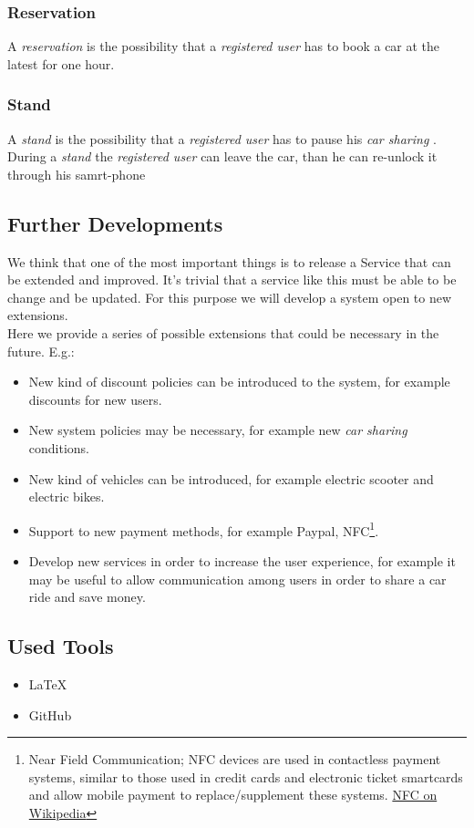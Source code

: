 \documentclass[english]{article}
\newcommand{\carsharing}{\textit {car sharing }}
\newcommand{\registereduser}{\textit {registered user }}
\newcommand{\resevation}{\textit{reservation }}
\newcommand{\stand}{\textit{stand }}
\begin{document}
	\subsubsection{Reservation}
		A \resevation is the possibility that a \registereduser has to book a car at the latest for one hour.
	\subsubsection{Stand}
		A \stand is the possibility that a \registereduser has to pause his \carsharing. During a \stand the \registereduser can leave the car, than he can re-unlock it through his samrt-phone 

\subsection{Further Developments}
	We think that one of the most important things is to release a Service that can be extended and improved. It's trivial that a service like this must be able to be change and be updated.
	For this purpose we will develop a system open to new extensions. \\
	Here we provide a series of possible extensions that could be necessary in the future.
	E.g.:
	\begin{itemize}
		\item New kind of discount policies can be introduced to the system, for example discounts for new users. 
		\item New system policies may be necessary, for example new \carsharing conditions.
		\item New kind of vehicles can be introduced, for example electric scooter and electric bikes.
		\item Support to new payment methods, for example Paypal\textregistered, NFC\footnote{Near Field Communication; NFC devices are used in contactless payment systems, similar to those used in credit cards and electronic ticket smartcards and allow mobile payment to replace/supplement these systems. \href{https://en.wikipedia.org/wiki/Near_field_communication}{NFC on Wikipedia}}.
		\item Develop new services in order to increase the user experience, for example it may be useful to allow communication among users in order to share a car ride and save money.
	\end{itemize}
	\subsection{Used Tools}
	\begin{itemize}
		\item \LaTeX\\
		\item GitHub\\
	\end{itemize}
\end{document}
